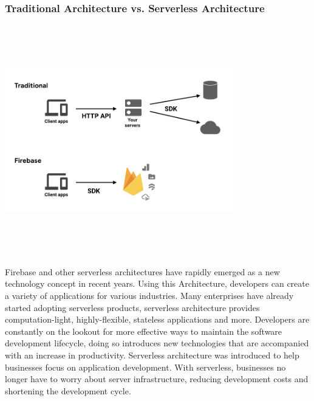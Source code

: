 \subsubsection{Traditional Architecture vs. Serverless Architecture}
\begin{center}
    \includegraphics[width=10cm,height=10cm,keepaspectratio]{Images/firebasetradpic.png}
\end{center}

Firebase and other serverless architectures have rapidly emerged as a new technology concept in recent years. Using this Architecture, developers can create a variety of applications for various industries. Many enterprises have already started adopting serverless products, serverless architecture provides computation-light, highly-flexible, stateless applications and more. Developers are constantly on the lookout for more effective ways to maintain the software development lifecycle, doing so introduces new technologies that are accompanied with an increase in productivity. \newline
Serverless architecture was introduced to help businesses focus on application development. With serverless, businesses no longer have to worry about server infrastructure, reducing development costs and shortening the development cycle.\newline

